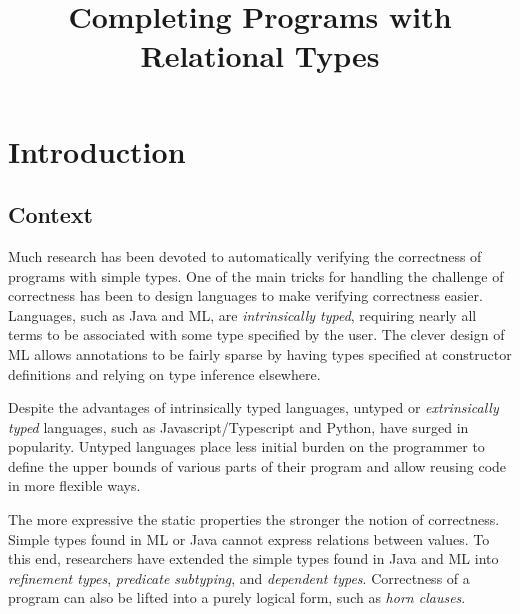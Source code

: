 \documentclass[sigplan,screen,review]{acmart}
\title{Completing Programs with Relational Types}
\begin{document}
\newcommand{\code}[1]{\texttt{#1}}
\newcommand{\claim}{\ \vdash\ }
\newcommand{\hastype}{\ \ddagger\ }
\newcommand{\subtypes}{\ \sqsubseteq\ }
\newcommand{\I}{\hspace{4mm}}
\newcommand{\B}[1]{\textbf{#1}}
\newcommand{\F}[1]{\text{#1}}
\newcommand{\bigand}{\bigwedge\nolimits}
\newcommand{\C}[1]{\color{teal} \rhd\ \emph{#1}}
\newcommand{\FIG}[1]{Fig. {\color{red} \ref{#1}}}
\newcommand{\TODO}[1]{\noindent \textbf{\color{red} TODO: #1}}
     



\maketitle


\section{Introduction}

\subsection{Context}
Much research has been devoted to automatically verifying the correctness of programs with simple types.
One of the main tricks for handling the challenge of correctness has been
to design languages to make verifying correctness easier. Languages, such as Java and ML, 
are \textit{intrinsically typed}, 
requiring nearly all terms to be associated with some type specified by the user. 
The clever design of ML allows annotations to be fairly sparse by 
having types specified at constructor definitions and relying on type inference elsewhere.

Despite the advantages of intrinsically typed languages,
untyped or \textit{extrinsically typed} languages, 
such as Javascript/Typescript and Python, have surged in popularity. 
Untyped languages place less initial burden on the programmer to define the upper bounds  
of various parts of their program and allow reusing code in more flexible ways. 

The more expressive the static properties the stronger the notion of correctness. 
Simple types found in ML or Java cannot express relations between values.
To this end, researchers have extended the simple types found in Java and ML into 
\textit{refinement types}, \textit{predicate subtyping}, and \textit{dependent types}. 
Correctness of a program can also be lifted into a purely logical form, such as \textit{horn clauses}. 
\end{document}
